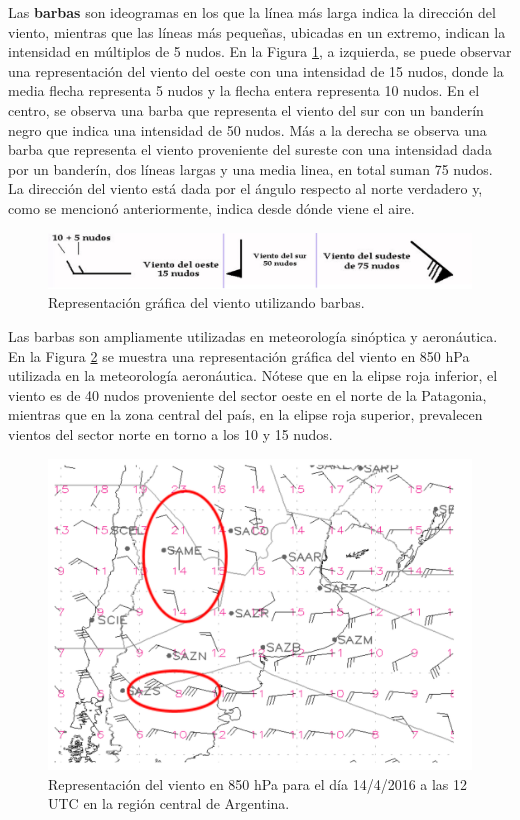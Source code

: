 Las \textbf{barbas} \cite{CursoDeObsevadores} son ideogramas en los que la línea más larga indica la dirección del viento, mientras que las líneas más pequeñas, ubicadas en un extremo, indican la intensidad en múltiplos de 5 nudos. En la Figura \ref{fig:barbas1}, a izquierda, se puede observar una representación del viento del oeste con una intensidad de 15 nudos, donde la media flecha representa 5 nudos y la flecha entera representa 10 nudos. En el centro, se observa una barba que representa el viento del sur con un banderín negro que indica una intensidad de 50 nudos. Más a la derecha se observa una barba que representa el viento proveniente del sureste con una intensidad dada por un banderín, dos líneas largas y una media linea, en total suman 75 nudos. La dirección del viento está dada por el ángulo respecto al norte verdadero y, como se mencionó anteriormente, indica desde dónde viene el aire.

\begin{figure}[H]
    \centering
    \includegraphics[width=1\linewidth]{Figuras/viento/barbas.png}
    \caption{Representación gráfica del viento utilizando barbas. \cite{cursoObservadores2024}}
    \label{fig:barbas1}
\end{figure}

Las barbas son ampliamente utilizadas en meteorología sinóptica y aeronáutica. En la Figura \ref{fig:mapaBarbas} se muestra una representación gráfica del viento en 850 \unit{\hecto\pascal} utilizada en la meteorología aeronáutica. Nótese que en la elipse roja inferior, el viento es de 40 nudos proveniente del sector oeste en el norte de la Patagonia, mientras que en la zona central del país, en la elipse roja superior, prevalecen vientos del sector norte en torno a los 10 y 15 nudos.


\begin{figure}[H]
    \centering
    \includegraphics[width=0.85\linewidth]{Figuras/viento/mapaBarbas.png}
    \caption{Representación del viento en 850 \unit{\hecto\pascal} para el día 14/4/2016 a las 12 UTC en la región central de Argentina. \cite{cursoObservadores2024}}
    \label{fig:mapaBarbas}
\end{figure}

